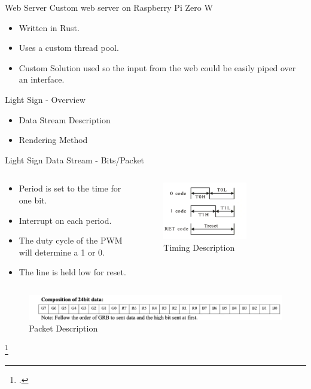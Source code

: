 \documentclass[10pt]{beamer}
\begin{document}
\begin{frame}{Web Server}
  \large
  Custom web server on Raspberry Pi Zero W
  \begin{itemize}
    \item Written in Rust.
    \item Uses a custom thread pool.
    \item Custom Solution used so the input from the web could be easily piped over an interface.
  \end{itemize}
\end{frame}

\begin{frame}{Light Sign \-- Overview}
  \Large
  \begin{itemize}
    \item Data Stream Description
    \item Rendering Method
  \end{itemize}
\end{frame}
\begin{frame}{Light Sign Data Stream \-- Bits/Packet}
  \begin{columns}
    \begin{column}{0.7\textwidth}
        \begin{itemize}
          \item Period is set to the time for one bit.
          \item Interrupt on each period.
          \item The duty cycle of the PWM will determine a 1 or 0.
          \item The line is held low for reset.
        \end{itemize}
    \end{column}
    \begin{column}{0.5\textwidth}
      \begin{figure}
        \centering
        \includegraphics[width=0.7\textwidth]{figures/timing.png}
        \caption{Timing Description}
      \end{figure}
    \end{column}
  \end{columns}
  \begin{figure}
    \centering
    \includegraphics[width=1.0\textwidth]{figures/packet.png}
    \caption{Packet Description}
  \end{figure}
  \footcite{WS2812B}
\end{frame}
\end{document}

